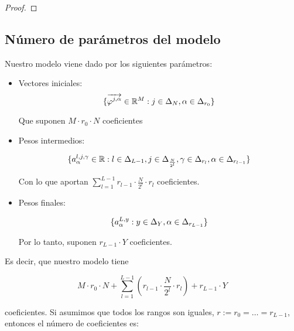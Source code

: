 \begin{proof}
\end{proof}

\subsection{Número de parámetros del modelo} \label{msubs:parametros_modelo_ht}

Nuestro modelo viene dado por los siguientes parámetros:

\begin{itemize}
	\item Vectores iniciales:
	      \begin{equation}
		      \{\overrightarrow{\varphi^{j, \alpha}} \in \mathbb{R}^M: j \in \Delta_{N}, \alpha \in \Delta_{r_0}  \}
	      \end{equation}

	      Que suponen $M \cdot r_0 \cdot N$ coeficientes
	\item Pesos intermedios:

	      \begin{equation}
		      \{ a^{l, j, \gamma}_{\alpha} \in \mathbb{R}: l \in \Delta_{L-1}, j \in \Delta_{\frac{N}{2^l}}, \gamma \in \Delta_{r_l}, \alpha \in \Delta_{r_{l-1}} \}
	      \end{equation}

	      Con lo que aportan $\sum_{l = 1}^{L-1} r_{l-1} \cdot \frac{N}{2^l} \cdot r_l$ coeficientes.

	\item Pesos finales:

	      \begin{equation}
		      \{a^{L, y}_{\alpha}: y \in \Delta_{Y}, \alpha \in \Delta_{r_{L-1}} \}
	      \end{equation}

	      Por lo tanto, suponen $r_{L-1} \cdot Y$ coeficientes.
\end{itemize}

Es decir, que nuestro modelo tiene

\begin{equation}
	M \cdot r_0 \cdot N + \sum_{l = 1}^{L-1} (r_{l-1} \cdot \frac{N}{2^l} \cdot r_l ) +
	r_{L-1} \cdot Y
\end{equation}

coeficientes. Si asumimos que todos los rangos son iguales, $r := r_0 = \ldots = r_{L-1}$, entonces el número de coeficientes es:

